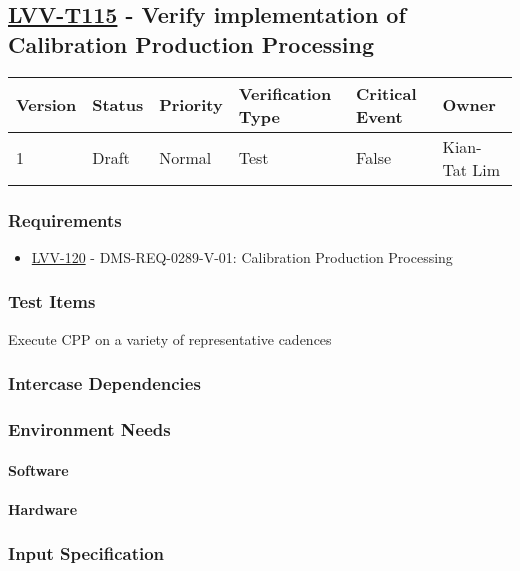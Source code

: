 \subsection{\href{https://jira.lsstcorp.org/secure/Tests.jspa\#/testCase/LVV-T115}{LVV-T115}
    - Verify implementation of Calibration Production Processing}\label{lvv-t115}

\begin{longtable}[]{llllll}
\toprule
Version & Status & Priority & Verification Type & Critical Event & Owner
\\\midrule
1 & Draft & Normal &
Test & False & Kian-Tat Lim
\\\bottomrule
\end{longtable}

\subsubsection{Requirements}
\begin{itemize}
\item \href{https://jira.lsstcorp.org/browse/LVV-120}{LVV-120} - DMS-REQ-0289-V-01: Calibration Production Processing
\end{itemize}

\subsubsection{Test Items}
Execute CPP on a variety of representative cadences



\subsubsection{Intercase Dependencies}

\subsubsection{Environment Needs}

\paragraph{Software}

\paragraph{Hardware}

\subsubsection{Input Specification}

